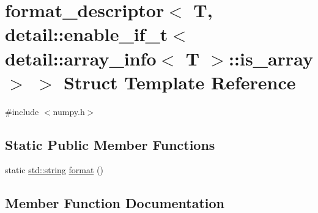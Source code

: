 \hypertarget{structformat__descriptor_3_01_t_00_01detail_1_1enable__if__t_3_01detail_1_1array__info_3_01_t_01_4_1_1is__array_01_4_01_4}{}\section{format\+\_\+descriptor$<$ T, detail\+::enable\+\_\+if\+\_\+t$<$ detail\+::array\+\_\+info$<$ T $>$\+::is\+\_\+array $>$ $>$ Struct Template Reference}
\label{structformat__descriptor_3_01_t_00_01detail_1_1enable__if__t_3_01detail_1_1array__info_3_01_t_01_4_1_1is__array_01_4_01_4}


{\ttfamily \#include $<$numpy.\+h$>$}

\subsection*{Static Public Member Functions}
\begin{DoxyCompactItemize}
\item 
static \mbox{\hyperlink{_s_d_l__opengl__glext_8h_ab4ccfaa8ab0e1afaae94dc96ef52dde1}{std\+::string}} \mbox{\hyperlink{structformat__descriptor_3_01_t_00_01detail_1_1enable__if__t_3_01detail_1_1array__info_3_01_t_01_4_1_1is__array_01_4_01_4_a262663ba66d4062b839cd56671a92928}{format}} ()
\end{DoxyCompactItemize}


\subsection{Member Function Documentation}
\mbox{\label{structformat__descriptor_3_01_t_00_01detail_1_1enable__if__t_3_01detail_1_1array__info_3_01_t_01_4_1_1is__array_01_4_01_4_a262663ba66d4062b839cd56671a92928}} 

